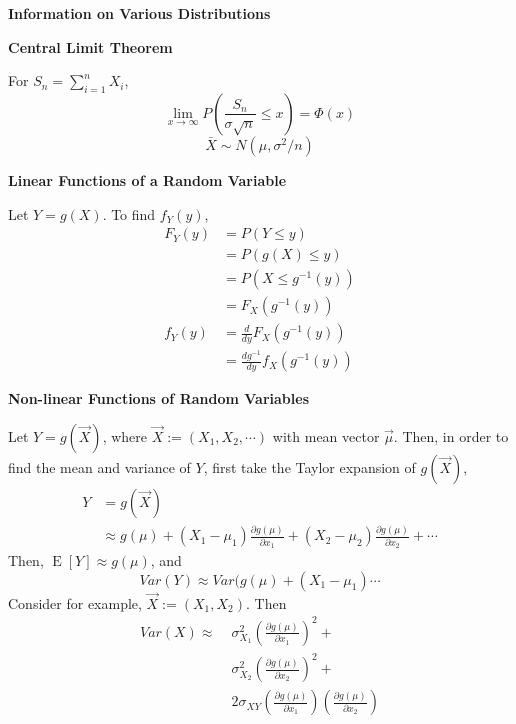 \documentclass[a4paper]{article}
\newcommand{\subheading}[1]{{\scriptsize\textbf{#1}}}
\renewenvironment{section}[1]
  {
    \subheading{#1}

  }{
    \smallskip
  }
\newcommand{\expectation}[1]{\operatorname{E}[#1]}
\begin{document}
\begin{multicols*}{4}
\begin{section}{Information on Various Distributions}
\end{section}

\begin{section}{Central Limit Theorem}
  For $S_n = \sum^n_{i=1} X_i$,
  $$\lim_{x\rightarrow \infty}
    P \left ( \frac{S_n}{\sigma \sqrt{n}} \leq x \right )
    = \Phi(x)$$
  $$\bar{X} \sim N(\mu, \sigma^2/n)$$
\end{section}

\begin{section}{Linear Functions of a Random Variable}
  Let $Y = g(X)$. To find $f_Y(y)$,
  \begin{align*}
    F_Y(y) &= P(Y \leq y) \\
      &= P(g(X) \leq y) \\
      &= P(X \leq g^{-1}(y)) \\
      &= F_X(g^{-1}(y)) \\
    f_Y(y) &= \frac{d}{dy} F_X(g^{-1}(y)) \\
      &= \frac{dg^{-1}}{dy} f_X(g^{-1}(y))
  \end{align*}
\end{section}

\begin{section}{Non-linear Functions of Random Variables}
  Let $Y = g(\vec{X})$, where $\vec{X} := (X_1, X_2, \cdots)$ with mean vector
  $\vec{\mu}$. Then, in order to find the mean and variance of $Y$, first take
  the Taylor expansion of $g(\vec{X})$,
  \begin{align*}
    Y &= g(\vec{X}) \\
      &\approx
        g(\mu) +
        (X_1 - \mu_1)\frac{\partial g(\mu)}{\partial x_1} +
        (X_2 - \mu_2)\frac{\partial g(\mu)}{\partial x_2} + \cdots
  \end{align*}
  Then, $\expectation{Y} \approx g(\mu)$, and
  $$Var(Y) \approx Var(g(\mu) + (X_1 - \mu_1)\cdots$$
  Consider for example, $\vec{X} := (X_1, X_2)$. Then
  \begin{align*}
  Var(X) \approx\;
    &\sigma^2_{X_1} \left ( \frac{\partial g(\mu)}{\partial x_1} \right )^2 + \\
    &\sigma^2_{X_2} \left ( \frac{\partial g(\mu)}{\partial x_2} \right )^2 + \\
    &2\sigma_{XY} \left ( \frac{\partial g(\mu)}{\partial x_1} \right )
    \left ( \frac{\partial g(\mu)}{\partial x_2} \right )
  \end{align*}
\end{section}


\end{multicols*}
\end{document}
